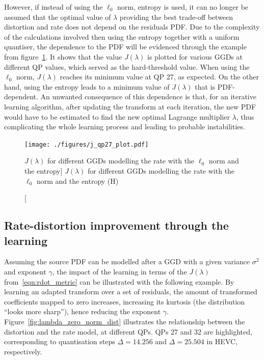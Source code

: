 \documentclass[11pt,a4paper,openright,twoside]{book}
\numberwithin{equation}{section} %
\numberwithin{figure}{section} %
\numberwithin{table}{section} %
\begin{document}
However, if instead of using the $\ell_0$ norm, entropy is used, it can
no longer be assumed that the optimal value of $\lambda$ providing the
best trade-off between distortion and rate does not depend on the
residuals \ac{PDF}.
Due to the complexity of the calculations involved then using the
entropy together with a uniform quantiser, the dependence to the
\ac{PDF} will be evidenced through the example from
figure~\ref{fig:j_lambda_qp}.
It shows that the value $J(\lambda)$ is plotted for various \acp{GGD} at
different \ac{QP} values, which served as the hard-threshold value.
When using the $\ell_0$ norm, $J(\lambda)$ reaches its minimum value at
QP 27, as expected.
On the other hand, using the entropy leads to a minimum value of
$J(\lambda)$ that is \ac{PDF}-dependent.
An unwanted consequence of this dependence is that, for an iterative
learning algorithm, after updating the transform at each iteration, the
new \ac{PDF} would have to be estimated to find the new optimal Lagrange
multiplier $\lambda$, thus complicating the whole learning process and
leading to probable instabilities.
\begin{figure}[tp]
	\centering
	\texttt{[image: ./figures/j\_qp27\_plot.pdf]}
	\caption
	[$J(\lambda)$ for different \acsp{GGD} modelling the rate with
	the $\ell_0$ norm and the entropy]
	{$J(\lambda)$ for different \acsp{GGD} modelling the rate with
	the $\ell_0$ norm and the entropy (H)}
	\label{fig:j_lambda_qp}
\end{figure}

\subsection{Rate-distortion improvement through the learning}
\label{sub:rate_distortion_improvement_through_the_learning}

Assuming the source \ac{PDF} can be modelled after a \ac{GGD} with a
given variance $\sigma^2$ and exponent $\gamma$, the impact of the
learning in terms of the $J(\lambda)$ from~\eqref{eqn:rdot_metric} can
be illustrated with the following example.
By learning an adapted transform over a set of residuals, the amount of
transformed coefficients mapped to zero increases, increasing its
kurtosis (the distribution ``looks more sharp''), hence reducing the
exponent $\gamma$.
Figure~\ref{fig:lambda_zero_norm_dist} illustrates the relationship
between the distortion and the rate model, at different \acp{QP}.
\acp{QP} 27 and 32 are highlighted, corresponding to quantisation steps
$\Delta = 14.256$ and $\Delta = 25.504$ in \ac{HEVC}, respectively.
\end{document}
